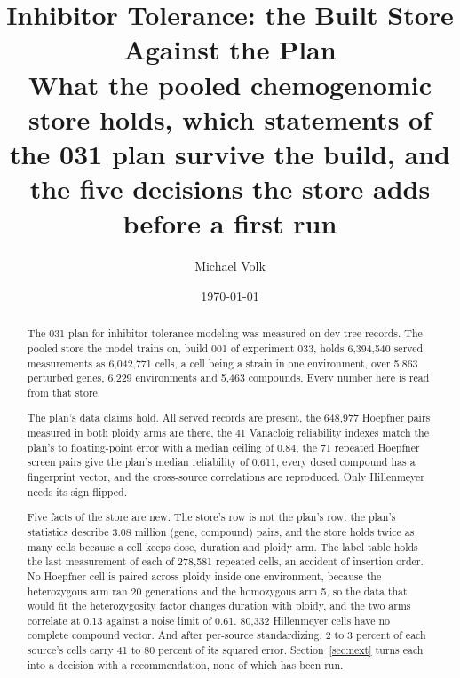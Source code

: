 \documentclass[10pt,a4paper]{article}
\title{\vspace{-1.5em}Inhibitor Tolerance: the Built Store Against the Plan\\
  {\large What the pooled chemogenomic store holds, which statements of the 031 plan
   survive the build, and the five decisions the store adds before a first run}}
\author{Michael Volk}
\date{\today}
\begin{document}
\maketitle
\thispagestyle{empty}

\begin{abstract}
\noindent
The 031 plan for inhibitor-tolerance modeling was measured on dev-tree records. The pooled
store the model trains on, build 001 of experiment 033, holds 6{,}394{,}540 served
measurements as 6{,}042{,}771 cells, a cell being a strain in one environment, over
5{,}863 perturbed genes, 6{,}229 environments and 5{,}463 compounds. Every number here is
read from that store.

The plan's data claims hold. All served records are present, the 648{,}977 Hoepfner pairs
measured in both ploidy arms are there, the 41 Vanacloig reliability indexes match the
plan's to floating-point error with a median ceiling of 0.84, the 71 repeated Hoepfner
screen pairs give the plan's median reliability of 0.611, every dosed compound has a
fingerprint vector, and the cross-source correlations are reproduced. Only Hillenmeyer
needs its sign flipped.

Five facts of the store are new. The store's row is not the plan's row: the plan's
statistics describe 3.08 million (gene, compound) pairs, and the store holds twice as many
cells because a cell keeps dose, duration and ploidy arm. The label table holds the last
measurement of each of 278{,}581 repeated cells, an accident of insertion order. No
Hoepfner cell is paired across ploidy inside one environment, because the heterozygous arm
ran 20 generations and the homozygous arm 5, so the data that would fit the heterozygosity
factor changes duration with ploidy, and the two arms correlate at 0.13 against a noise
limit of 0.61. 80{,}332 Hillenmeyer cells have no complete compound vector. And after
per-source standardizing, 2 to 3 percent of each source's cells carry 41 to 80 percent of
its squared error. Section~\ref{sec:next} turns each into a decision with a
recommendation, none of which has been run.
\end{abstract}

\vspace{0.5em}
\tccontents
\clearpage









\end{document}
